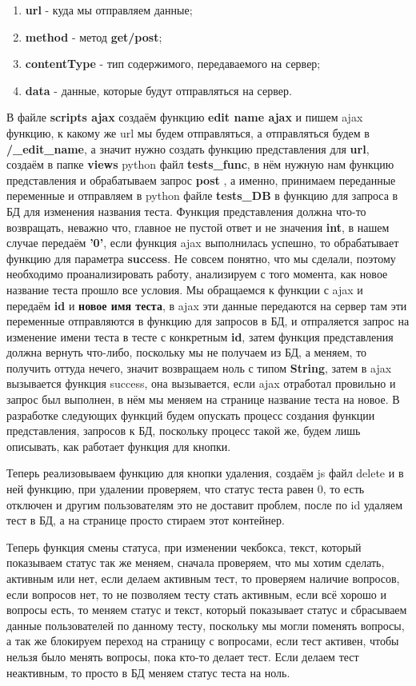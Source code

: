 \documentclass[12pt, oldlfont, amsfonts]{report}
\begin{document}
\begin{enumerate}
\item {\bf url} - куда мы отправляем данные;
\item {\bf method} - метод {\bf get/post};
\item {\bf contentType} - тип содержимого, передаваемого на сервер;
\item {\bf data} - данные, которые будут отправляться на сервер. 
\end{enumerate}

В файле {\bf scripts ajax} создаём функцию {\bf edit name ajax} и пишем ajax функцию, к какому же url мы будем отправляться, а отправляться будем в {\bf /\_edit\_name}, а значит нужно создать функцию представления для {\bf url}, создаём в папке {\bf views} python файл {\bf tests\_func}, в нём нужную нам функцию представления и обрабатываем запрос {\bf post} , а именно, принимаем переданные переменные и отправляем в python файле {\bf tests\_DB} в функцию для запроса в БД для изменения названия теста. Функция представления должна что-то возвращать, неважно что, главное не пустой ответ и не значения {\bf int}, в нашем случае передаём {\bf '0'}, если функция ajax выполнилась успешно, то обрабатывает функцию для параметра {\bf success}. Не совсем понятно, что мы сделали, поэтому необходимо проанализировать работу, анализируем с того момента, как новое название теста прошло все условия. Мы обращаемся к функции с {ajax} и передаём {\bf id} и {\bf новое имя теста}, в ajax эти данные передаются на сервер там эти переменные отправляются в функцию для запросов в БД, и отпраляется запрос на изменение имени теста в тесте с конкретным {\bf id}, затем функция представления должна вернуть что-либо, поскольку мы не получаем из БД, а меняем, то получить оттуда нечего, значит возвращаем ноль с типом {\bf String}, затем в ajax вызывается функция {success}, она вызывается, если ajax отработал провильно и запрос был выполнен, в нём мы меняем на странице название теста на новое. В разработке следующих функций будем опускать процесс создания функции представления, запросов к БД, поскольку процесс такой же, будем лишь описывать, как работает функция для кнопки. 

Теперь реализовываем функцию для кнопки удаления, создаём js файл {delete} и в ней функцию, при удалении проверяем, что статус теста равен 0, то есть отключен и другим пользователям это не доставит проблем, после по id удаляем тест в БД, а на странице просто стираем этот контейнер. 

Теперь функция смены статуса, при изменении чекбокса, текст, который показываем статус так же меняем, сначала проверяем, что мы хотим сделать, активным или нет, если делаем активным тест, то проверяем наличие вопросов, если вопросов нет, то не позволяем тесту стать активным, если всё хорошо и вопросы есть, то меняем статус и текст, который показывает статус и сбрасываем данные пользователей по данному тесту, поскольку мы могли поменять вопросы, а так же блокируем переход на страницу с вопросами, если тест активен, чтобы нельзя было менять вопросы, пока кто-то делает тест. Если делаем тест неактивным, то просто в БД меняем статус теста на ноль.
\end{document}
